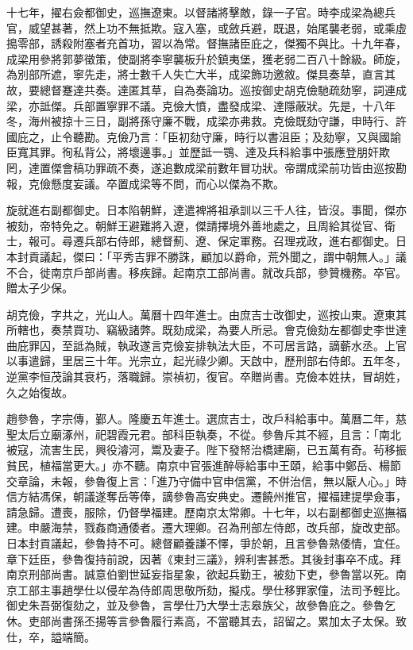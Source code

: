 \begin{pinyinscope}
十七年，擢右僉都御史，巡撫遼東。以督諸將擊敵，錄一子官。時李成梁為總兵官，威望甚著，然上功不無抵欺。寇入塞，或斂兵避，既退，始尾襲老弱，或乘虛搗零部，誘殺附塞者充首功，習以為常。督撫諸臣庇之，傑獨不與比。十九年春，成梁用參將郭夢徵策，使副將李寧襲板升於鎮夷堡，獲老弱二百八十餘級。師旋，為別部所遮，寧先走，將士數千人失亡大半，成梁飾功邀敘。傑具奏草，直言其故，要總督蹇達共奏。達匿其草，自為奏論功。巡按御史胡克儉馳疏劾寧，詞連成梁，亦詆傑。兵部置寧罪不議。克儉大憤，盡發成梁、達隱蔽狀。先是，十八年冬，海州被掠十三日，副將孫守廉不戰，成梁亦弗救。克儉既劾守謙，申時行、許國庇之，止令聽勘。克儉乃言：「臣初劾守廉，時行以書沮臣；及劾寧，又與國諭臣寬其罪。徇私背公，將壞邊事。」並歷詆一鶚、達及兵科給事中張應登朋奸欺罔，達置傑會稿功罪疏不奏，遂追數成梁前數年冒功狀。帝謂成梁前功皆由巡按勘報，克儉懸度妄議。卒置成梁等不問，而心以傑為不欺。

旋就進右副都御史。日本陷朝鮮，達遣裨將祖承訓以三千人往，皆沒。事聞，傑亦被劾，帝特免之。朝鮮王避難將入遼，傑請擇境外善地處之，且周給其從官、衛士，報可。尋遷兵部右侍郎，總督薊、遼、保定軍務。召理戎政，進右都御史。日本封貢議起，傑曰：「平秀吉罪不勝誅，顧加以爵命，荒外聞之，謂中朝無人。」議不合，徙南京戶部尚書。移疾歸。起南京工部尚書。就改兵部，參贊機務。卒官。贈太子少保。

胡克儉，字共之，光山人。萬曆十四年進士。由庶吉士改御史，巡按山東。遼東其所轄也，奏禁買功、竊級諸弊。既劾成梁，為要人所忌。會克儉劾左都御史李世達曲庇罪囚，至詆為賊，執政遂言克儉妄排執法大臣，不可居言路，謫蘄水丞。上官以事遣歸，里居三十年。光宗立，起光祿少卿。天啟中，歷刑部右侍郎。五年冬，逆黨李恒茂論其衰朽，落職歸。崇禎初，復官。卒贈尚書。克儉本姓扶，冒胡姓，久之始復故。

趙參魯，字宗傳，鄞人。隆慶五年進士。選庶吉士，改戶科給事中。萬曆二年，慈聖太后立廟涿州，祀碧霞元君。部科臣執奏，不從。參魯斥其不經，且言：「南北被寇，流害生民，興役濬河，鬻及妻子。陛下發帑治橋建廟，已五萬有奇。茍移振貧民，植福當更大。」亦不聽。南京中官張進醉辱給事中王頤，給事中鄭岳、楊節交章論，未報，參魯復上言：「進乃守備中官申信黨，不併治信，無以厭人心。」時信方結馮保，朝議遂奪岳等俸，謫參魯高安典史。遷饒州推官，擢福建提學僉事，請急歸。遭喪，服除，仍督學福建。歷南京太常卿。十七年，以右副都御史巡撫福建。申嚴海禁，戮姦商通倭者。遷大理卿。召為刑部左侍郎，改兵部，旋改吏部。日本封貢議起，參魯持不可。總督顧養謙不懌，爭於朝，且言參魯熟倭情，宜任。章下廷臣，參魯復持前說，因著《東封三議》，辨利害甚悉。其後封事卒不成。拜南京刑部尚書。誠意伯劉世延妄指星象，欲起兵勤王，被劾下吏，參魯當以死。南京工部主事趙學仕以侵牟為侍郎周思敬所劾，擬戍。學仕移罪家僮，法司予輕比。御史朱吾弼復劾之，並及參魯，言學仕乃大學士志皋族父，故參魯庇之。參魯乞休。吏部尚書孫丕揚等言參魯履行素高，不當聽其去，詔留之。累加太子太保。致仕，卒，謚端簡。


\end{pinyinscope}
